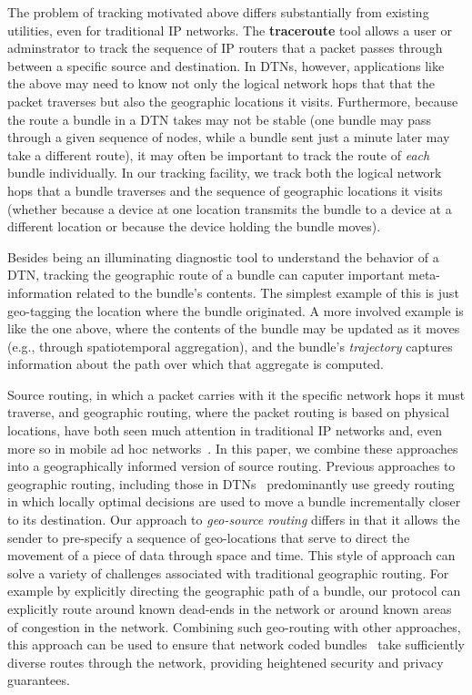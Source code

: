 The problem of tracking motivated above differs substantially from existing utilities, even for traditional IP networks. The {\bf traceroute} tool allows a user or adminstrator to track the sequence of IP routers that a packet passes through between a specific source and destination. In DTNs, however, applications like the above may need to know not only the logical network hops that that the packet traverses but also the geographic locations it visits. Furthermore, because the route a bundle in a DTN takes may not be stable (one bundle may pass through a given sequence of nodes, while a bundle sent just a minute later may take a different route), it may often be important to track the route of {\em each} bundle individually. In our tracking facility, we track both the logical network hops that a bundle traverses and the sequence of geographic locations it visits (whether because a device at one location transmits the bundle to a device at a different location or because the device holding the bundle moves).

Besides being an illuminating diagnostic tool to understand the behavior of a DTN, tracking the geographic route of a bundle can caputer important meta-information related to the bundle's contents. The simplest example of this is just geo-tagging the location where the bundle originated. A more involved example is like the one above, where the contents of the bundle may be updated as it moves (e.g., through spatiotemporal aggregation), and the bundle's {\em trajectory} captures information about the path over which that aggregate is computed.

Source routing, in which a packet carries with it the specific network hops it must traverse, and geographic routing, where the packet routing is based on physical locations, have both seen much attention in traditional IP networks and, even more so in mobile ad hoc networks~\cite{johnson96:dynamic, karp00:gpsr}. In this paper, we combine these approaches into a geographically informed version of source routing. Previous approaches to geographic routing, including those in DTNs~\cite{goeRoutinginDTNs} predominantly use greedy routing in which locally optimal decisions are used to move a bundle incrementally closer to its destination. Our approach to {\em geo-source routing} differs in that it allows the sender to pre-specify a sequence of geo-locations that serve to direct the movement of a piece of data through space and time. This style of approach can solve a variety of challenges associated with traditional geographic routing. For example by explicitly directing the geographic path of a bundle, our protocol can explicitly route around known dead-ends in the network or around known areas of congestion in the network. Combining such geo-routing with other approaches, this approach can be used to ensure that network coded bundles~\cite{ncrouting} take sufficiently diverse routes through the network, providing heightened security and privacy guarantees.

